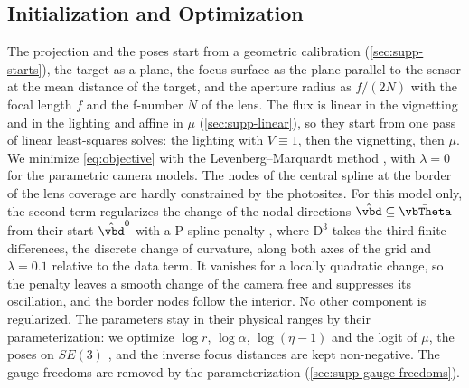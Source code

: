 \subsection{Initialization and Optimization}
\label{sec:optimization}
The projection and the poses start from a geometric calibration
(\cref{sec:supp-starts}), the target as a plane, the focus surface
as the plane parallel to the sensor at the mean distance of the
target, and the aperture radius as $f/(2N)$ with the focal length
$f$ and the f-number $N$ of the lens. The flux is linear in the
vignetting and in the lighting and affine in $\mu$
(\cref{sec:supp-linear}), so they start from one pass of linear
least-squares solves: the lighting with $V\equiv1$, then the
vignetting, then $\mu$. We minimize \cref{eq:objective} with the
Levenberg--Marquardt method \cite{marquardt1963algorithm}, with
$\lambda=0$ for the parametric camera models. The nodes of the central spline at
the border of the lens coverage are hardly constrained by the
photosites. For this model only, the second term regularizes the
change of the nodal directions $\hat{\vbd}\subseteq\bar{\vbTheta}$
from their start $\hat{\vbd}^{0}$ with a P-spline penalty
\cite{eilers1996flexible}, where $\mathrm{D}^3$ takes the third finite
differences, the discrete change of curvature, along both axes of the
grid and $\lambda=0.1$ relative to the data term. It
vanishes for a locally quadratic change, so the penalty leaves a
smooth change of the camera free and suppresses its oscillation, and
the border nodes follow the interior.
No other component is regularized. The parameters stay in their
physical ranges by their parameterization: we optimize $\log r$,
$\log\alpha$, $\log(\eta-1)$ and the logit of $\mu$, the poses on
$SE(3)$ \cite{solà2021microlietheorystate}, and the inverse focus
distances are kept non-negative. The gauge freedoms are removed by
the parameterization (\cref{sec:supp-gauge-freedoms}).
